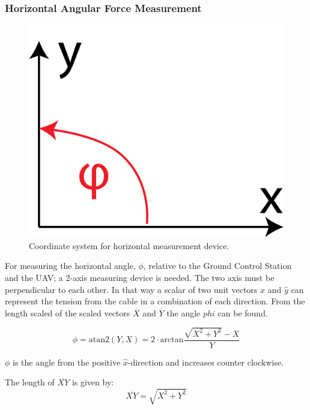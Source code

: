    

\subsubsection{Horizontal Angular Force Measurement}
\label{sec:horizontalMeasurementAnalysis}
\begin{figure}[hbtp]
\centering
\includegraphics[scale=0.25]{graphics/horizontal_coordinatesystem.png}
\caption{Coordinate system for horizontal measurement device.}
\end{figure}

For measuring the horizontal angle, $\phi$, relative to the Ground Control Station and the UAV; a 2-axis measuring device is needed. The two axis must be perpendicular to each other. In that way a scalar of two unit vectors $\hat{x}$ and $\hat{y}$ can represent the tension from the cable in a combination of each direction. 
From the length scaled of the scaled vectors $\overline{X}$ and $\overline{Y}$ the angle $phi$ can be found.

\begin{equation}
\phi = \mathrm{atan2} (Y,  X) = 2 \cdot \mathrm{arctan} \frac{\sqrt{X^2+Y^2}-X}{Y}
\end{equation}

\noindent
$\phi$ is the angle from the positive $\hat{x}$-direction and increases counter clockwise. 

\noindent
The length of $\overline{XY}$ is given by:
\begin{equation}
\overline{XY} = \sqrt{X^2+Y^2}
\end{equation}

